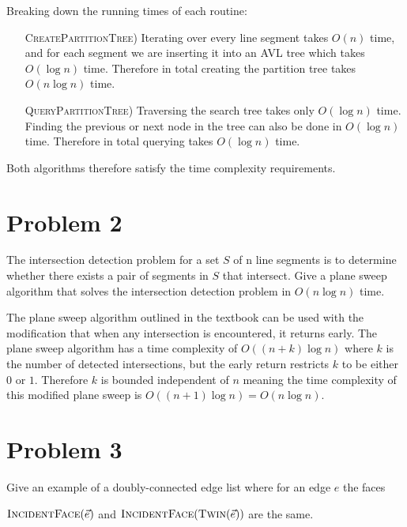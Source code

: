 \documentclass[12pt]{extarticle}
\begin{document}
\begin{solution}
    Breaking down the running times of each routine:
    \begin{enumerate}[leftmargin=5cm]
        \item[\textsc{CreatePartitionTree})]
            Iterating over every line segment takes $O(n)$ time, and for each segment we are inserting it into an AVL tree which takes $O(\log n)$ time. Therefore in total creating the partition tree takes $O(n \log n)$ time.
        \item[\textsc{QueryPartitionTree})]
            Traversing the search tree takes only $O(\log n)$ time. Finding the previous or next node in the tree can also be done in $O(\log n)$ time. Therefore in total querying takes $O(\log n)$ time.
    \end{enumerate}
    Both algorithms therefore satisfy the time complexity requirements.
\end{solution}

\section*{Problem 2}

The intersection detection problem for a set $S$ of n line segments is to determine whether there exists a pair of segments in $S$ that intersect. Give a plane sweep algorithm that solves the intersection detection problem in $O(n \log n)$ time.

\begin{solution}
    The plane sweep algorithm outlined in the textbook can be used with the modification that when any intersection is encountered, it returns early. The plane sweep algorithm has a time complexity of $O((n+k)\log n)$ where $k$ is the number of detected intersections, but the early return restricts $k$ to be either $0$ or $1$. Therefore $k$ is bounded independent of $n$ meaning the time complexity of this modified plane sweep is $O((n+1) \log n) = O(n \log n)$.
\end{solution}

\section*{Problem 3}
Give an example of a doubly-connected edge list where for an edge $e$ the faces 

$\textsc{IncidentFace}(\vec{e})$ and $\textsc{IncidentFace}(\textsc{Twin}(\vec{e}))$ are the same.
\end{document}
